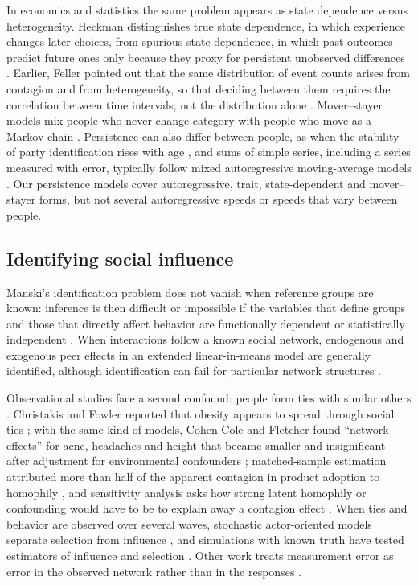 In economics and statistics the same problem appears as state dependence versus heterogeneity. Heckman distinguishes true state dependence, in which experience changes later choices, from spurious state dependence, in which past outcomes predict future ones only because they proxy for persistent unobserved differences \cite{heckman1981}. Earlier, Feller pointed out that the same distribution of event counts arises from contagion and from heterogeneity, so that deciding between them requires the correlation between time intervals, not the distribution alone \cite{feller1943}. Mover--stayer models mix people who never change category with people who move as a Markov chain \cite{blumen1955,goodman1961}. Persistence can also differ between people, as when the stability of party identification rises with age \cite{alwinkrosnick1991}, and sums of simple series, including a series measured with error, typically follow mixed autoregressive moving-average models \cite{granger1976}. Our persistence models cover autoregressive, trait, state-dependent and mover--stayer forms, but not several autoregressive speeds or speeds that vary between people.

\subsection{Identifying social influence}\label{sec:bg-identification}

Manski's identification problem does not vanish when reference groups are known: inference is then difficult or impossible if the variables that define groups and those that directly affect behavior are functionally dependent or statistically independent \cite{manski1993}. When interactions follow a known social network, endogenous and exogenous peer effects in an extended linear-in-means model are generally identified, although identification can fail for particular network structures \cite{bramoulle2009}.

Observational studies face a second confound: people form ties with similar others \cite{mcpherson2001}. Christakis and Fowler reported that obesity appears to spread through social ties \cite{christakis2007}; with the same kind of models, Cohen-Cole and Fletcher found ``network effects'' for acne, headaches and height that became smaller and insignificant after adjustment for environmental confounders \cite{cohencole2008}; matched-sample estimation attributed more than half of the apparent contagion in product adoption to homophily \cite{aral2009}, and sensitivity analysis asks how strong latent homophily or confounding would have to be to explain away a contagion effect \cite{vanderweele2011}. When ties and behavior are observed over several waves, stochastic actor-oriented models separate selection from influence \cite{snijders2010,steglich2010}, and simulations with known truth have tested estimators of influence and selection \cite{zachrison2016,daza2021}. Other work treats measurement error as error in the observed network rather than in the responses \cite{xu2021sensitivity,advani2018credibly}.


